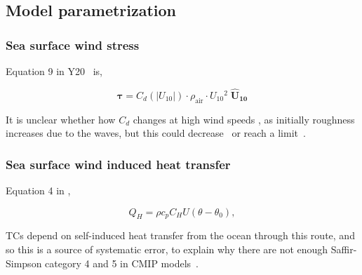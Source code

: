 \subsection{Model parametrization}
\label{sec:param}
\subsubsection{Sea surface wind stress}


Equation 9 in Y20~\cite{ZannaPreprint} is,

\begin{equation}
 \boldsymbol{\tau} = C_d(|U_{10}|)\cdot \rho_{\mathrm{air}} \cdot U_{10}{}^2  \;{}\mathbf{\hat{U}_{10}}
 \label{eq:tau}
 \end{equation}

 It is unclear whether how $C_d$ changes at high wind speeds
 \cite{powell2003reduced}, as initially roughness increases
 due to the waves, but this could decrease~\cite{powell2003reduced}
 or reach a limit~\cite{donelan2004limiting}.


\subsubsection{Sea surface wind induced heat transfer}

% 

Equation 4 in \cite{zou2017observation},

\begin{equation}
Q_{H}=\rho c_{p} C_{H} U\left(\theta-\theta_{0}\right),
\end{equation}


TCs depend
on self-induced heat transfer from the ocean through this route,
and so this is a source of systematic error, to explain why there are
not enough Saffir-Simpson category
4 and 5 in CMIP models~\cite{emanuel2005divine}.
